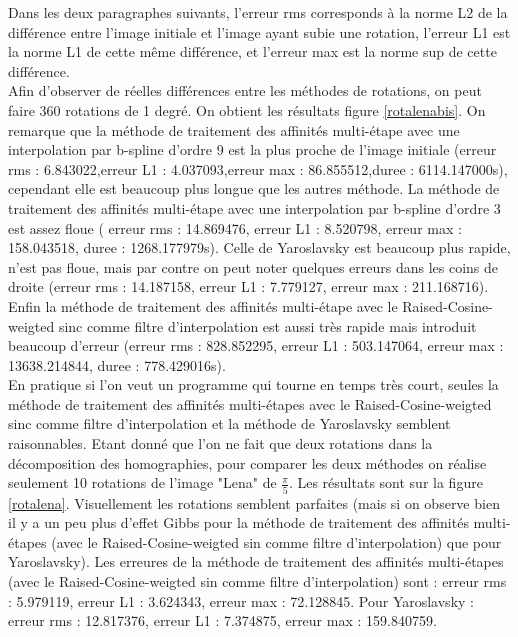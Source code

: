	Dans les deux paragraphes suivants, l'erreur rms corresponds à la norme L2 de la différence entre l'image initiale et l'image ayant subie une rotation, l'erreur L1 est la norme L1 de cette même différence, et l'erreur max est la norme sup de cette différence.\\

	Afin d'observer de réelles différences entre les méthodes de rotations, on peut faire 360 rotations de 1 degré. On obtient les résultats figure  \ref{rotalenabis}.  On remarque que la méthode de traitement des affinités multi-étape avec une interpolation par b-spline d'ordre 9 est la plus proche de l'image initiale (erreur rms : 6.843022,erreur L1 : 4.037093,erreur max : 86.855512,duree : 6114.147000s), cependant elle est beaucoup plus longue que les autres méthode.  La méthode de traitement des affinités multi-étape avec une interpolation par b-spline d'ordre 3 est assez floue ( erreur rms : 14.869476, erreur L1 : 8.520798, erreur max : 158.043518, duree : 1268.177979s). Celle de Yaroslavsky est beaucoup plus rapide, n'est pas floue, mais par contre on peut noter quelques erreurs dans les coins de droite (erreur rms : 14.187158, erreur L1 : 7.779127, erreur max : 211.168716). Enfin  la méthode de traitement des affinités multi-étape avec le  Raised-Cosine-weigted sinc comme filtre d'interpolation est aussi très rapide mais introduit beaucoup d'erreur (erreur rms : 828.852295, erreur L1 : 503.147064, erreur max : 13638.214844, duree : 778.429016s).\\

	En pratique si l'on veut un programme qui tourne en temps très court, seules  la méthode de traitement des affinités multi-étapes avec le Raised-Cosine-weigted sinc comme filtre d'interpolation et la méthode de Yaroslavsky semblent raisonnables. Etant donné que l'on ne fait que deux rotations dans la décomposition des homographies, pour comparer les deux méthodes on réalise seulement 10 rotations de l'image "Lena" de $\frac{\pi}{5}$. Les résultats sont sur la figure \ref{rotalena}. Visuellement les rotations semblent parfaites (mais si on observe bien il y a un peu plus d'effet Gibbs pour la méthode de traitement des affinités multi-étapes (avec le Raised-Cosine-weigted sin comme filtre d'interpolation) que pour Yaroslavsky). Les erreures de la méthode de traitement des affinités multi-étapes (avec le Raised-Cosine-weigted sin comme filtre d'interpolation) sont : erreur rms : 5.979119, erreur L1 : 3.624343, erreur max : 72.128845. Pour Yaroslavsky : erreur rms : 12.817376, erreur L1 : 7.374875, erreur max : 159.840759. \\

